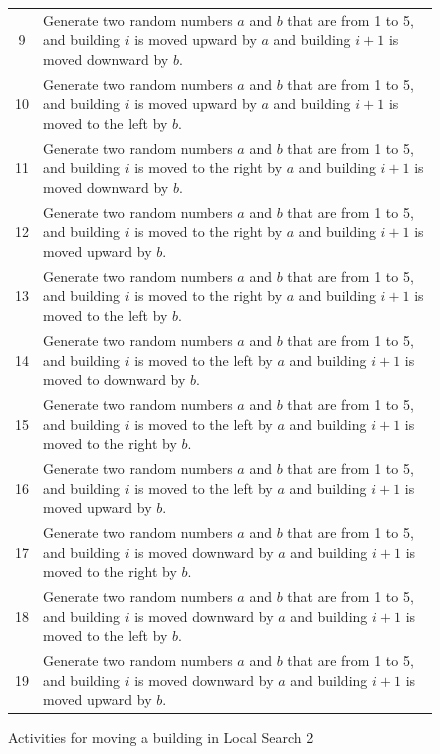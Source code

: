 \begin{figure}
\begin{center}
\begin{tabular}{| c | p{110mm} |}
			9  & Generate two random numbers $a$ and $b$ that are from 1 to 5, and building $i$ is moved upward by $a$ and building $i + 1$ is moved downward by $b$. \\
			10 & Generate two random numbers $a$ and $b$ that are from 1 to 5, and building $i$ is moved upward by $a$ and building $i + 1$ is moved to the left by $b$. \\
			11 & Generate two random numbers $a$ and $b$ that are from 1 to 5, and building $i$ is moved to the right by $a$ and building $i + 1$ is moved downward by $b$. \\
			12 & Generate two random numbers $a$ and $b$ that are from 1 to 5, and building $i$ is moved to the right by $a$ and building $i + 1$ is moved upward by $b$. \\
			13 & Generate two random numbers $a$ and $b$ that are from 1 to 5, and building $i$ is moved to the right by $a$ and building $i + 1$ is moved to the left by $b$. \\
			14 & Generate two random numbers $a$ and $b$ that are from 1 to 5, and building $i$ is moved to the left by $a$ and building $i + 1$ is moved to downward by $b$. \\
			15 & Generate two random numbers $a$ and $b$ that are from 1 to 5, and building $i$ is moved to the left by $a$ and building $i + 1$ is moved to the right by $b$. \\
			16 & Generate two random numbers $a$ and $b$ that are from 1 to 5, and building $i$ is moved to the left by $a$ and building $i + 1$ is moved upward by $b$. \\
			17 & Generate two random numbers $a$ and $b$ that are from 1 to 5, and building $i$ is moved downward by $a$ and building $i + 1$ is moved to the right by $b$. \\
			18 & Generate two random numbers $a$ and $b$ that are from 1 to 5, and building $i$ is moved downward by $a$ and building $i + 1$ is moved to the left by $b$. \\
			19 & Generate two random numbers $a$ and $b$ that are from 1 to 5, and building $i$ is moved downward by $a$ and building $i + 1$ is moved upward by $b$. \\
			\hline
		\end{tabular}
	\end{center}
	\caption{Activities for moving a building in Local Search 2}
	\label{local-search-2-activities}
\end{figure}

